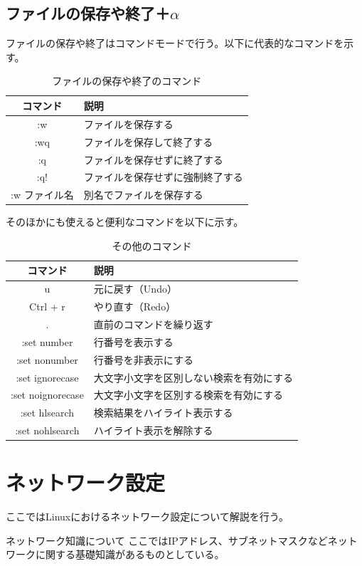 \documentclass[a4paper, 11pt, dvipdfmx]{jsarticle}
\begin{document}
\subsection{ファイルの保存や終了＋$\alpha$}
ファイルの保存や終了はコマンドモードで行う。以下に代表的なコマンドを示す。
\begin{table}[H]
  \centering
  \caption{ファイルの保存や終了のコマンド}
  \begin{tabular}{|c|l|} \hline
    コマンド & 説明 \\ \hline
    :w & ファイルを保存する \\
    :wq & ファイルを保存して終了する \\
    :q & ファイルを保存せずに終了する \\
    :q! & ファイルを保存せずに強制終了する \\
    :w {ファイル名} & 別名でファイルを保存する \\ \hline
  \end{tabular}
\end{table}
そのほかにも使えると便利なコマンドを以下に示す。
\begin{table}[H]
  \centering
  \caption{その他のコマンド}
  \begin{tabular}{|c|l|} \hline
    コマンド & 説明 \\ \hline
    u & 元に戻す（Undo） \\
    Ctrl + r & やり直す（Redo） \\
    . & 直前のコマンドを繰り返す \\
    :set number & 行番号を表示する \\
    :set nonumber & 行番号を非表示にする \\
    :set ignorecase & 大文字小文字を区別しない検索を有効にする \\
    :set noignorecase & 大文字小文字を区別する検索を有効にする \\
    :set hlsearch & 検索結果をハイライト表示する \\
    :set nohlsearch & ハイライト表示を解除する \\ \hline
  \end{tabular}
\end{table}
\section{ネットワーク設定}
ここではLinuxにおけるネットワーク設定について解説を行う。
\begin{attentionbox}{ネットワーク知識について}
  ここではIPアドレス、サブネットマスクなどネットワークに関する基礎知識があるものとしている。
\end{attentionbox}
\end{document}
